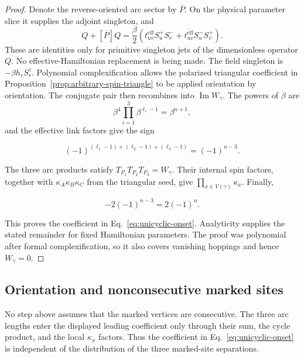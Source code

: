 \begin{proof}
Denote the reverse-oriented arc sector by $\overline P$.  On the physical
parameter slice it supplies the adjoint singleton, and
\begin{equation}
 [P]Q+[\overline P]Q
 =\frac{\beta}{2}\left(
 t_{uv}^{\mathrm{eff}}S_u^+S_v^-
 +\overline{t_{uv}^{\mathrm{eff}}}S_u^-S_v^+
 \right).
 \label{eq:primitive-effective-Hermitian-link}
\end{equation}
These are identities only for primitive singleton jets of the dimensionless
operator $Q$.  No effective-Hamiltonian replacement is being made.  The
field singleton is $-\beta h_rS_r^z$.  Polynomial complexification allows
the polarized triangular coefficient in
Proposition~\ref{prop:arbitrary-spin-triangle} to be applied orientation by
orientation.  The conjugate pair then recombines into
$\operatorname{Im}W_\gamma$.  The powers of $\beta$ are
\begin{equation}
 \beta^4\prod_{i=1}^3\beta^{\ell_i-1}=\beta^{n+1},
 \label{eq:three-arc-beta-power}
\end{equation}
and the effective link factors give the sign

\begin{equation}
 (-1)^{(\ell_1-1)+(\ell_2-1)+(\ell_3-1)}=(-1)^{n-3}.
 \label{eq:three-arc-sign}
\end{equation}

The three arc products satisfy
$T_{P_1}T_{P_2}T_{P_3}=W_\gamma$.  Their internal spin factors, together with
$\kappa_A\kappa_B\kappa_C$ from the triangular seed, give
$\prod_{x\in V(\gamma)}\kappa_x$.  Finally,

\begin{equation}
 -2(-1)^{n-3}=2(-1)^n.
 \label{eq:unicyclic-final-sign}
\end{equation}

This proves the coefficient in Eq.~\eqref{eq:unicyclic-onset}.  Analyticity
supplies the stated remainder for fixed Hamiltonian parameters.  The proof
was polynomial after formal complexification, so it also covers vanishing
hoppings and hence $W_\gamma=0$.
\end{proof}

\subsection{Orientation and nonconsecutive marked sites}

No step above assumes that the marked vertices are consecutive.  The three
arc lengths enter the displayed leading coefficient only through their sum,
the cycle product, and the local $\kappa_x$ factors.  Thus the coefficient in
Eq.~\eqref{eq:unicyclic-onset} is independent of the distribution of the
three marked-site separations.

